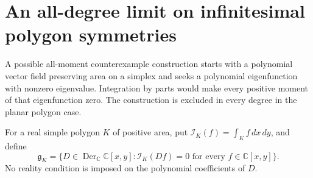 \documentclass[11pt]{article}
\newcommand{\C}{\mathbb C}
\begin{document}
\section{An all-degree limit on infinitesimal polygon symmetries}
A possible all-moment counterexample construction starts with a
polynomial vector field preserving area on a simplex and seeks a
polynomial eigenfunction with nonzero eigenvalue. Integration by parts
would make every positive moment of that eigenfunction zero.
The construction is excluded in every degree in the planar polygon case.

For a real simple polygon $K$ of positive area, put
$\mathcal I_K(f)=\int_K f\,dx\,dy$, and define
\[
 \mathfrak g_K=\{D\in\operatorname{Der}_{\C}\C[x,y]:
                       \mathcal I_K(Df)=0\text{ for every }f\in\C[x,y]\}.
\]
No reality condition is imposed on the polynomial coefficients of $D$.
\end{document}

